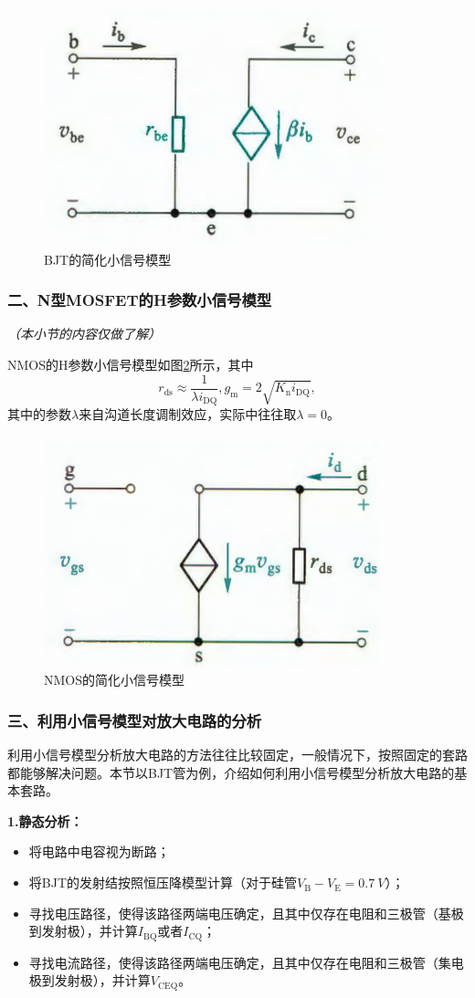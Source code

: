\begin{figure}[htb]
    \centering
    \includegraphics[width=0.3\linewidth]{pic/BJT的简化小信号模型.png}
    \caption{BJT的简化小信号模型\cite{康华光}\label{BJT的简化小信号模型}}
\end{figure}

\subsubsection{二、N型MOSFET的H参数小信号模型}
\textit{（本小节的内容仅做了解）}

NMOS的H参数小信号模型如图\ref{NMOS的简化小信号模型}所示，其中
\begin{equation}
    r_{\mathrm{ds}}\approx\frac{1}{\lambda i_{\mathrm{DQ}}}, g_\mathrm{m}=2\sqrt{K_{\mathrm{n}}i_{\mathrm{DQ}}},
\end{equation}
其中的参数$\lambda$来自沟道长度调制效应，实际中往往取$\lambda=0$。

\begin{figure}[htb]
    \centering
    \includegraphics[width=0.3\linewidth]{pic/NMOS的简化小信号模型.png}
    \caption{NMOS的简化小信号模型\cite{康华光}\label{NMOS的简化小信号模型}}
\end{figure}

\subsubsection{三、利用小信号模型对放大电路的分析}
利用小信号模型分析放大电路的方法往往比较固定，一般情况下，按照固定的套路都能够解决问题。本节以BJT管为例，介绍如何利用小信号模型分析放大电路的基本套路。

\textbf{1.静态分析：}

\begin{itemize}
    \item 将电路中电容视为断路；
    \item 将BJT的发射结按照恒压降模型计算（对于硅管$V_{\mathrm{B}}-V_{\mathrm{E}}=\qty{0.7}{V}$）；
    \item 寻找电压路径，使得该路径两端电压确定，且其中仅存在电阻和三极管（基极到发射极），并计算$I_{\mathrm{BQ}}$或者$I_{\mathrm{CQ}}$；
    \item 寻找电流路径，使得该路径两端电压确定，且其中仅存在电阻和三极管（集电极到发射极），并计算$V_{\mathrm{CEQ}}$。
\end{itemize}

